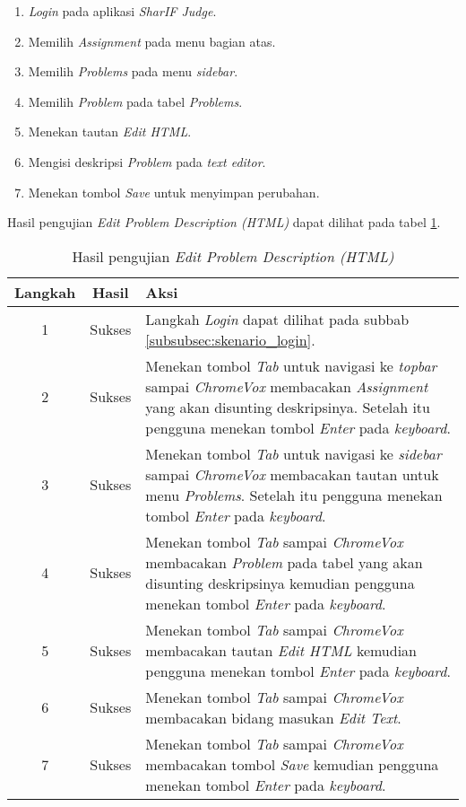 \begin{enumerate}
	\item \textit{Login} pada aplikasi \textit{SharIF Judge}.
	\item Memilih \textit{Assignment} pada menu bagian atas.
	\item Memilih \textit{Problems} pada menu \textit{sidebar}.
	\item Memilih \textit{Problem} pada tabel \textit{Problems}.
	\item Menekan tautan \textit{Edit HTML}.
	\item Mengisi deskripsi \textit{Problem} pada \textit{text editor}.
	\item Menekan tombol \textit{Save} untuk menyimpan perubahan.
\end{enumerate}

Hasil pengujian \textit{Edit Problem Description (HTML)} dapat dilihat pada tabel \ref{tab:hasil_edit_problem_description_html}.

\begin{table}[H]
	\centering
	\caption{Hasil pengujian \textit{Edit Problem Description (HTML)}}
	\label{tab:hasil_edit_problem_description_html}
	\begin{tabular}{|c|c|p{12cm}|}
		\toprule
		Langkah & Hasil & Aksi\\
		\midrule
		1 & Sukses & Langkah \textit{Login} dapat dilihat pada subbab \ref{subsubsec:skenario_login}.\\
		2 & Sukses & Menekan tombol \textit{Tab} untuk navigasi ke \textit{topbar} sampai \textit{ChromeVox} membacakan \textit{Assignment} yang akan disunting deskripsinya. Setelah itu pengguna menekan tombol \textit{Enter} pada \textit{keyboard}.\\
		3 & Sukses & Menekan tombol \textit{Tab} untuk navigasi ke \textit{sidebar} sampai \textit{ChromeVox} membacakan tautan untuk menu \textit{Problems}. Setelah itu pengguna menekan tombol \textit{Enter} pada \textit{keyboard}.\\
		4 & Sukses & Menekan tombol \textit{Tab} sampai \textit{ChromeVox} membacakan \textit{Problem} pada tabel yang akan disunting deskripsinya kemudian pengguna menekan tombol \textit{Enter} pada \textit{keyboard}.\\
		5 & Sukses & Menekan tombol \textit{Tab} sampai \textit{ChromeVox} membacakan tautan \textit{Edit HTML} kemudian pengguna menekan tombol \textit{Enter} pada \textit{keyboard}.\\
		6 & Sukses & Menekan tombol \textit{Tab} sampai \textit{ChromeVox} membacakan bidang masukan \textit{Edit Text}.\\
		7 & Sukses & Menekan tombol \textit{Tab} sampai \textit{ChromeVox} membacakan tombol \textit{Save} kemudian pengguna menekan tombol \textit{Enter} pada \textit{keyboard}.\\
		\bottomrule
	\end{tabular}
\end{table}


